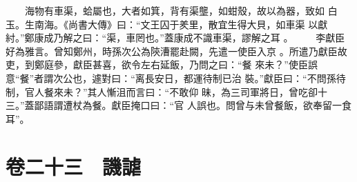 \documentclass{ctexart}
\begin{document}
　　海物有車渠，蛤屬也，大者如箕，背有渠壟，如蚶殼，故以為器，致如 白玉。生南海。《尚書大傳》曰：``文王囚于羑里，散宜生得大貝，如車渠 以獻紂。''鄭康成乃解之曰：``渠，車罔也。''蓋康成不識車渠，謬解之耳 。 　　李獻臣好為雅言。曾知鄭州，時孫次公為陝漕罷赴闕，先遣一使臣入京 。所遣乃獻臣故吏，到鄭庭參，獻臣甚喜，欲令左右延飯，乃問之曰：``餐 來未？''使臣誤意``餐''者謂次公也，遽對曰：``离長安日，都運待制已治 裝。''獻臣曰：``不問孫待制，官人餐來未？''其人慚沮而言曰：``不敢仰 昧，為三司軍將日，曾吃卻十三。''蓋鄙語謂遭杖為餐。獻臣掩口曰：``官 人誤也。問曾与未曾餐飯，欲奉留一食耳''。
\clearpage
\section{卷二十三　譏謔}
\paragraph{}
\end{document}
